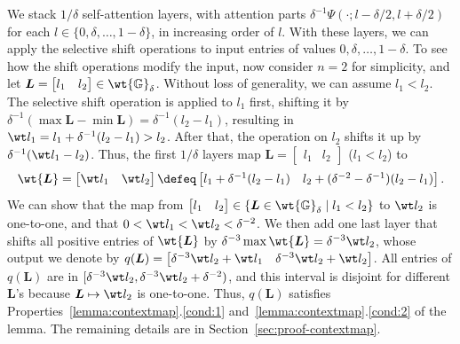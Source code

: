 \documentclass{article} %
\def\mL{{\bm{L}}}
\def\sG{{\mathbb{G}}}
\begin{document}
We stack $1/\delta$ self-attention layers, with attention parts $\delta^{-1} \Psi(\cdot;l-\delta/2,l+\delta/2)$ for each $l \in \{0, \delta, \dots, 1-\delta\}$, in increasing order of $l$. 
With these layers, we can apply the selective shift operations to input entries of values $0, \delta, \dots, 1-\delta$.
To see how the shift operations modify the input, now consider $n = 2$ for simplicity, and let $\mL = \begin{bmatrix} l_1 & l_2 \end{bmatrix} \in \wt {\sG}_{\delta}$. Without loss of generality, we can assume $l_1 < l_2$.
The selective shift operation is applied to $l_1$ first, shifting it by $\delta^{-1}(\max \mL - \min \mL) = \delta^{-1}(l_2-l_1)$, resulting in $\wt l_1 = l_1+\delta^{-1}(l_2-l_1) > l_2$. After that, the operation on $l_2$ shifts it up by $\delta^{-1} (\wt l_1 - l_2)$. Thus, the first $1/\delta$ layers map $\mL = \begin{bmatrix} l_1 & l_2 \end{bmatrix}$ ($l_1 < l_2$) to 
\begin{equation*}
\wt \mL 
= \begin{bmatrix} \wt l_1 & \wt l_2 \end{bmatrix}
\defeq 
\begin{bmatrix} l_1+\delta^{-1}(l_2-l_1) & l_2+(\delta^{-2}-\delta^{-1})(l_2-l_1) \end{bmatrix}.
\end{equation*}
We can show that the map from $\begin{bmatrix} l_1 & l_2 \end{bmatrix} \in \{ \mL \in \wt {\sG}_{\delta} \mid l_1 < l_2 \}$ to $\wt l_2$ is one-to-one, and that $0 < \wt l_1 < \wt l_2 < \delta^{-2}$. 
We then add one last layer that shifts all positive entries of $\wt \mL$ by $\delta^{-3} \max \wt \mL = \delta^{-3} \wt l_2$, whose output we denote by $q(\mL) = \begin{bmatrix} \delta^{-3} \wt l_2 + \wt l_1 & \delta^{-3} \wt l_2 + \wt l_2 \end{bmatrix}$. 
All entries of $q(\mL)$ are in $[\delta^{-3} \wt l_2, \delta^{-3} \wt l_2 + \delta^{-2})$, and this interval is disjoint for different $\mL$'s because $\mL \mapsto \wt l_2$ is one-to-one. Thus, $q(\mL)$ satisfies Properties~\ref{lemma:contextmap}.\ref{cond:1} and~\ref{lemma:contextmap}.\ref{cond:2} of the lemma. 
The remaining details are in Section~\ref{sec:proof-contextmap}.
\end{document}
